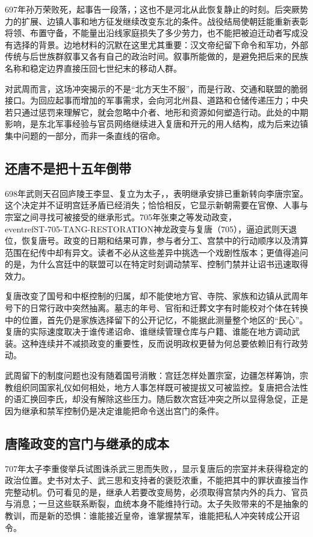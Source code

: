 697年孙万荣败死，起事告一段落，；这也不是河北从此恢复静止的时刻。后突厥势力的扩展、边镇人事和地方征发继续改变东北的条件。战役结局使朝廷能重新表彰将领、布置守备，不能量出沿线家庭损失了多少劳力，也不能把被迫迁动者写成没有选择的背景。边地材料的沉默在这里尤其重要：汉文帝纪留下命令和军功，外部传统与后世族群叙事又各有自己的政治时间。叙事所能做的，是避免把后来的民族名称和稳定边界直接压回七世纪末的移动人群。

对武周而言，这场冲突揭示的不是“北方天生不服”，而是行政、交通和联盟的脆弱接口。为回应起事而增加的军事需求，会向河北州县、道路和仓储传递压力；中央若只通过惩罚来理解它，就会忽略中介者、地形和资源如何塑造行动。此处的中期影响，是东北军事经验与官员网络继续进入复唐和开元的用人结构，成为后来边镇集中问题的一部分，而非一条直线的宿命。

\subsection{还唐不是把十五年倒带}
698年武则天召回庐陵王李显、复立为太子，，表明继承安排已重新转向李唐宗室。这个决定并不证明宫廷矛盾已经消失；恰恰相反，它显示新朝需要在官僚、人事与宗室之间寻找可被接受的继承形式。705年张柬之等发动政变，\\eventref{ST-705-TANG-RESTORATION}{神龙政变与复唐（705）}，逼迫武则天退位，恢复唐号。政变的日期和结果可靠，参与者分工、宫禁中的行动顺序以及清算范围在纪传中却有异文。读者不必从这些差异中挑选一个戏剧性版本；更值得追问的是，为什么宫廷中的联盟可以在特定时刻调动禁军、控制门禁并让诏书迅速取得效力。

复唐改变了国号和中枢控制的归属，却不能使地方官、寺院、家族和边镇从武周年号下的日常行政中突然抽离。墓志的年号、官衔和迁葬文字有时能校对个体在转换中的位置，首先仍是家族选择留下的公开记忆，不能据此测量整个地区的“民心”。复唐的实际速度取决于谁传递诏命、谁继续管理仓库与户籍、谁能在地方调动武装。这种连续并不减损政变的重要性，反而说明政权更替为何总要依赖旧有行政劳动。

武周留下的制度问题也没有随着国号消散：宫廷怎样处置宗室，边疆怎样筹饷，宗教组织同国家礼仪如何相处，地方人事怎样既可被提拔又可被监控。复唐把合法性的语汇换回李氏，却没有解除这些压力。随后数次宫廷冲突之所以显得急促，正是因为继承和禁军控制仍是决定谁能把命令送出宫门的条件。

\subsection{唐隆政变的宫门与继承的成本}
707年太子李重俊举兵试图诛杀武三思而失败，，显示复唐后的宗室并未获得稳定的政治位置。史书对太子、武三思和支持者的褒贬浓重，不能把其中的罪状直接当作完整动机。仍可看见的是，继承人若要改变局势，必须取得宫禁内外的兵力、官员与消息；一旦这些联系断裂，血统本身不能维持行动。太子失败带来的不是抽象的教训，而是新的恐惧：谁能接近皇帝，谁掌握禁军，谁能把私人冲突转成公开诏令。

